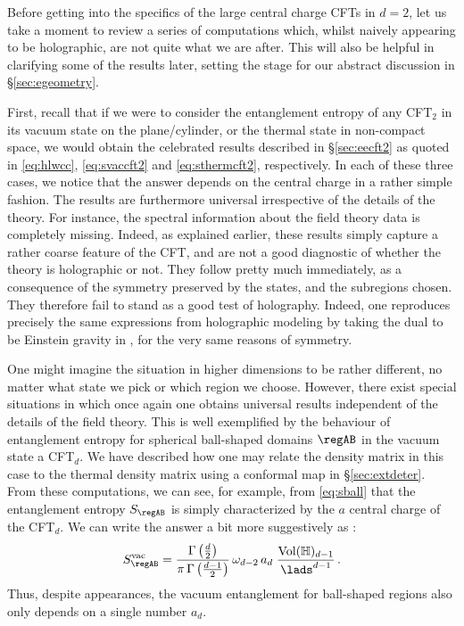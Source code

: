 \documentclass[12pt,openany]{book}
\begin{document}
Before getting into the specifics of the large central charge CFTs in $d=2$, let us take a moment to review a series of computations which, whilst naively appearing to be holographic, are not quite what we are after. This will also be helpful in clarifying some of the results later, setting the stage for our abstract discussion in \S\ref{sec:egeometry}.

First, recall that if we were to consider the entanglement entropy of any CFT$_2$ in its vacuum state on the plane/cylinder, or the thermal state in non-compact space, we would obtain the celebrated results described in \S\ref{sec:eecft2}  as quoted in \eqref{eq:hlwcc}, \eqref{eq:svaccft2} and \eqref{eq:sthermcft2}, respectively. In each of these three cases, we notice that the answer depends on the central charge in a rather simple fashion. The results are furthermore universal irrespective of the details of the theory. For instance, the spectral information about the field theory data is completely missing. Indeed, as explained earlier, these results simply capture a rather coarse feature of the CFT, and are not a good diagnostic of whether the theory is holographic or not. They follow pretty much immediately, as a consequence of the symmetry preserved by the states, and the subregions chosen. They therefore fail to stand as a  good test of holography. Indeed, one reproduces precisely the same expressions from holographic modeling by taking the dual to be Einstein gravity in , for the very same reasons of symmetry.

One might imagine the situation in higher dimensions to be rather different, no matter what state we pick or which region we choose. However, there exist special situations in which once again one obtains universal results independent of the details of the field theory. This is well exemplified by the behaviour of entanglement entropy for spherical ball-shaped domains $\regAB$ in the vacuum state a CFT$_d$. We have described how one may relate the density matrix in this case to the thermal density matrix using a conformal map  in \S\ref{sec:extdeter}. From these computations, we can see, for example, from \eqref{eq:sball} that the entanglement entropy $S_{\regAB}$ is simply characterized by the $a$ central charge  of the CFT$_d$. We can write the answer a bit more suggestively  as \cite{Casini:2011kv}:
%
\begin{equation}
S_{\regAB}^\text{vac} =
\frac{\Gamma\left(\frac{d}{2} \right)}{\pi \, \Gamma\left(\frac{d-1}{2}\right)}\, \omega_{d-2} \, a_d \;
\frac{\text{Vol}(\mathbb{H})_{d-1}}{\lads^{d-1}} \,.
\label{eq:chm2}
\end{equation}
%
 Thus, despite appearances, the vacuum entanglement for ball-shaped regions also only depends on a single number $a_d$.
\end{document}
